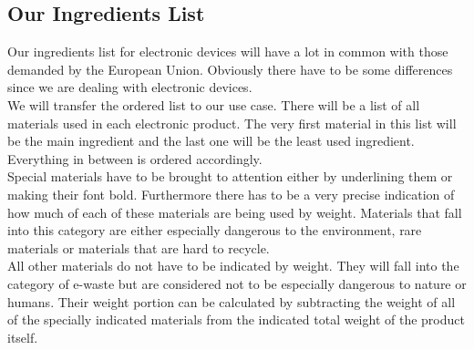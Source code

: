 \subsection{Our Ingredients List}

Our ingredients list for electronic devices will have a lot in common with those demanded by the European Union. Obviously there have to be some differences since we are dealing with electronic devices. \\

We will transfer the ordered list to our use case. There will be a list of all materials used in each electronic product. The very first material in this list will be the main ingredient and the last one will be the least used ingredient. Everything in between is ordered accordingly. \\
Special materials have to be brought to attention either by underlining them or making their font bold. Furthermore there has to be a very precise indication of how much of each of these materials are being used by weight. Materials that fall into this category are either especially dangerous to the environment, rare materials or materials that are hard to recycle. \\

All other materials do not have to be indicated by weight. They will fall into the category of e-waste but are considered not to be especially dangerous to nature or humans. Their weight portion can be calculated by subtracting the weight of all of the specially indicated materials from the indicated total weight of the product itself. 

